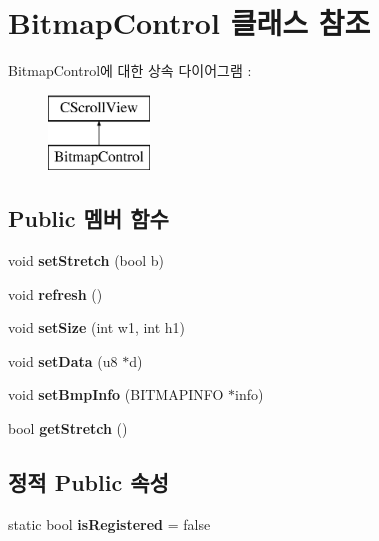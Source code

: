 \hypertarget{class_bitmap_control}{}\section{Bitmap\+Control 클래스 참조}
\label{class_bitmap_control}
Bitmap\+Control에 대한 상속 다이어그램 \+: \begin{figure}[H]
\begin{center}
\leavevmode
\includegraphics[height=2.000000cm]{class_bitmap_control}
\end{center}
\end{figure}
\subsection*{Public 멤버 함수}
\begin{DoxyCompactItemize}
\item 
\mbox{\label{class_bitmap_control_ab545e15ea3edda9f0d80c0b8b0b7c812}} 
void {\bfseries set\+Stretch} (bool b)
\item 
\mbox{\label{class_bitmap_control_acf061a1e9a4cad90ad2827c14f79caa2}} 
void {\bfseries refresh} ()
\item 
\mbox{\label{class_bitmap_control_a421004fe6ba01329dd69259396592d1f}} 
void {\bfseries set\+Size} (int w1, int h1)
\item 
\mbox{\label{class_bitmap_control_aa6206183896caf192a37709fa5d7b8d2}} 
void {\bfseries set\+Data} (u8 $\ast$d)
\item 
\mbox{\label{class_bitmap_control_a301c52fc62de4368fccdcdc93cefad0b}} 
void {\bfseries set\+Bmp\+Info} (B\+I\+T\+M\+A\+P\+I\+N\+FO $\ast$info)
\item 
\mbox{\label{class_bitmap_control_a1d3cff9a3b57dd7558d678177dcf4b5c}} 
bool {\bfseries get\+Stretch} ()
\end{DoxyCompactItemize}
\subsection*{정적 Public 속성}
\begin{DoxyCompactItemize}
\item 
\mbox{\label{class_bitmap_control_acd16ac02d48f1201fc90470b6e29c7fe}} 
static bool {\bfseries is\+Registered} = false
\end{DoxyCompactItemize}
